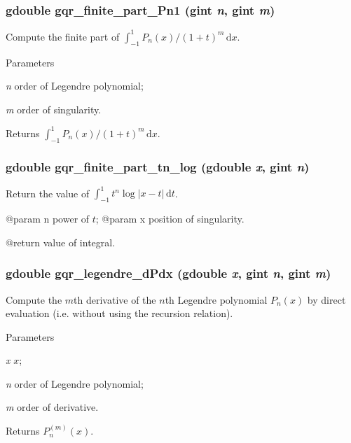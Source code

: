 \subsubsection[{gqr\_\-finite\_\-part\_\-Pn1}]{\setlength{\rightskip}{0pt plus 5cm}gdouble gqr\_\-finite\_\-part\_\-Pn1 (gint {\em n}, \/  gint {\em m})}\label{group__finite_gac419ae4d5e3e92696ef9d93ab2b409a4}
Compute the finite part of $\int_{-1}^{1}P_{n}(x)/(1+t)^{m}\,\mathrm{d}x$.


\begin{DoxyParams}{Parameters}
\item[{\em n}]order of Legendre polynomial; \item[{\em m}]order of singularity.\end{DoxyParams}
\begin{DoxyReturn}{Returns}
$\int_{-1}^{1}P_{n}(x)/(1+t)^{m}\,\mathrm{d}x$. 
\end{DoxyReturn}
\subsubsection[{gqr\_\-finite\_\-part\_\-tn\_\-log}]{\setlength{\rightskip}{0pt plus 5cm}gdouble gqr\_\-finite\_\-part\_\-tn\_\-log (gdouble {\em x}, \/  gint {\em n})}\label{group__finite_ga1af1c5ba0a9fb3f797c27f314f73c353}
Return the value of $\int_{-1}^{1}t^{n}\log|x-t|\,\mathrm{d}t$.

@param n power of $t$; @param x position of singularity.

@return value of integral. 
\subsubsection[{gqr\_\-legendre\_\-dPdx}]{\setlength{\rightskip}{0pt plus 5cm}gdouble gqr\_\-legendre\_\-dPdx (gdouble {\em x}, \/  gint {\em n}, \/  gint {\em m})}\label{group__finite_gafdf20c225f6de1835e824b5017d84536}
Compute the $m$th derivative of the $n$th Legendre polynomial $P_{n}(x)$ by direct evaluation (i.e. without using the recursion relation).


\begin{DoxyParams}{Parameters}
\item[{\em x}]$x$; \item[{\em n}]order of Legendre polynomial; \item[{\em m}]order of derivative.\end{DoxyParams}
\begin{DoxyReturn}{Returns}
$P_{n}^{(m)}(x)$. 
\end{DoxyReturn}
